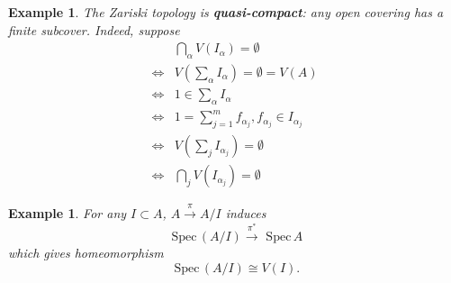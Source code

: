 \documentclass[11pt]{article}
\newtheorem{ex}[thm]{Example}
\newcommand{\spec}{\text{ Spec}\,}
\newcommand{\lrta}{\longrightarrow}
\newcommand{\Llrta}{\Longleftrightarrow}
\begin{document}
\begin{ex}
The Zariski topology is \textbf{quasi-compact}: any open covering has a finite subcover. Indeed, suppose
$$
\begin{aligned}
&\bigcap_\alpha V(I_\alpha)=\emptyset\\
\Llrta & V(\sum_\alpha I_\alpha)=\emptyset=V(A)\\
\Llrta & 1\in \sum_\alpha I_\alpha\\
\Llrta & 1=\sum_{j=1}^{m} f_{\alpha_j}, f_{\alpha_j}\in I_{\alpha_j}\\
\Llrta & V(\sum_j I_{\alpha_j})=\emptyset\\
\Llrta & \bigcap_j V(I_{\alpha_j})=\emptyset
\end{aligned}
$$
\end{ex}
\begin{ex}
For any $I\subset A$, $A\overset{\pi}{\lrta} A/I$ induces 
$$
\spec (A/I)\overset{\pi^*}{\lrta}\spec A
$$
which  gives homeomorphism 
$$
\spec (A/I)\cong V(I).
$$
\end{ex}
\end{document}
